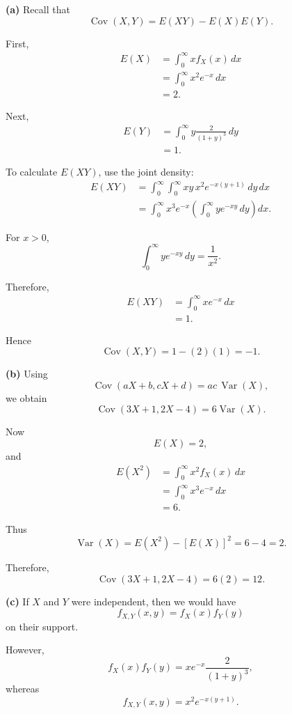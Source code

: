 \documentclass[11pt]{article}
\begin{document}
\begin{solutionbox}

\textbf{(a)} Recall that
\[
\operatorname{Cov}(X,Y)
=
E(XY)-E(X)E(Y).
\]

First,
\begin{align*}
E(X)
&=
\int_0^\infty x f_X(x)\,dx\\
&=
\int_0^\infty x^2e^{-x}\,dx\\
&=2.
\end{align*}

Next,
\begin{align*}
E(Y)
&=
\int_0^\infty y\frac{2}{(1+y)^3}\,dy\\
&=1.
\end{align*}

To calculate \(E(XY)\), use the joint density:
\begin{align*}
E(XY)
&=
\int_0^\infty\int_0^\infty
xy\,x^2e^{-x(y+1)}\,dy\,dx\\
&=
\int_0^\infty
x^3e^{-x}
\left(
\int_0^\infty y e^{-xy}\,dy
\right)dx.
\end{align*}

For \(x>0\),
\[
\int_0^\infty y e^{-xy}\,dy
=
\frac{1}{x^2}.
\]

Therefore,
\begin{align*}
E(XY)
&=
\int_0^\infty xe^{-x}\,dx\\
&=1.
\end{align*}

Hence
\[
\operatorname{Cov}(X,Y)
=
1-(2)(1)
=
-1.
\]


\textbf{(b)} Using
\[
\operatorname{Cov}(aX+b,cX+d)
=
ac\,\operatorname{Var}(X),
\]
we obtain
\[
\operatorname{Cov}(3X+1,2X-4)
=
6\operatorname{Var}(X).
\]

Now
\[
E(X)=2,
\]
and
\begin{align*}
E(X^2)
&=
\int_0^\infty x^2 f_X(x)\,dx\\
&=
\int_0^\infty x^3e^{-x}\,dx\\
&=6.
\end{align*}

Thus
\[
\operatorname{Var}(X)
=
E(X^2)-[E(X)]^2
=
6-4
=
2.
\]

Therefore,
\[
\operatorname{Cov}(3X+1,2X-4)
=
6(2)
=
12.
\]


\textbf{(c)} If \(X\) and \(Y\) were independent, then we would have
\[
f_{X,Y}(x,y)=f_X(x)f_Y(y)
\]
on their support.

However,
\[
f_X(x)f_Y(y)
=
xe^{-x}\frac{2}{(1+y)^3},
\]
whereas
\[
f_{X,Y}(x,y)
=
x^2e^{-x(y+1)}.
\]


\end{solutionbox}
\end{document}
